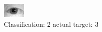 \begin{figure}[h!]
\begin{center}
\includegraphics[width=0.60\columnwidth]{figures/ID1138_class_2_target_3.png}
\end{center}
\caption{ Classification: 2 actual target: 3}
\label{fig:ID1138_class_2_target_3}
\end{figure}
